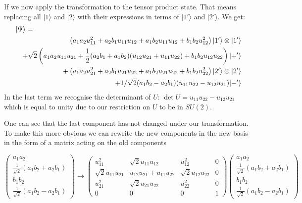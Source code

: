 \documentclass[12pt]{article}
\begin{document}
      If we now apply the transformation to the tensor product state. That means replacing all $|1\rangle$ and $|2\rangle$ with their expressions in terms of $|1'\rangle$ and $|2'\rangle$. We get:
      \begin{eqnarray}
     \lefteqn{   |\Psi\rangle =}&&\nonumber\\
        && \left(a_{1} a_{2} u_{11}^2 + a_{2} b_{1} u_{11} u_{12} + a_{1} b_{2} u_{11} u_{12} + b_{1} b_{2} u_{12}^2\right) |1'\rangle \otimes |1'\rangle\nonumber\\
        && +\sqrt{2}\left(a_{1} a_{2} u_{11} u_{21} + \frac{1}{2} (a_{2} b_{1}+a_{1} b_{2}) (u_{12} u_{21}+u_{11} u_{22} ) + b_{1} b_{2} u_{12} u_{22}\right) |+'\rangle \nonumber\\
        &&+ \left(a_{1} a_{2} u_{21}^2 + a_{2} b_{1} u_{21} u_{22} + a_{1} b_{2} u_{21} u_{22} + b_{1} b_{2} u_{22}^2\right) |2'\rangle \otimes |2'\rangle\nonumber\\
        && +1/\sqrt2 (a_{1} b_{2} - a_{2} b_{1}) (u_{11} u_{22} - u_{12} u_{21})|-'\rangle
      \end{eqnarray}
      In the last term we recognise the determinant of $U$: $\det U=u_{11}u_{22}-u_{12}u_{21}$ which is equal to unity due to our restriction on $U$ to be in $SU(2)$.

      One can see that the last component has not changed under our transformation. To make this more obvious we can rewrite the new components in the new basis in the form of a matrix acting on the old components

      \[\left(\begin{array}{c}a_1a_2\\\frac{1}{\sqrt2}(a_1b_2+a_2b_1)\\b_1b_2\\\frac{1}{\sqrt{2}}(a_1b_2-a_2b_1)\end{array}\right)\rightarrow
      \left(\begin{array}{cccc}
        u_{11}^2&\sqrt{2} u_{11} u_{12}&u_{12}^2&0 \\
        \sqrt{2}u_{11}u_{21}&u_{12} u_{21} +u_{11}u_{22}&\sqrt{2}u_{12}u_{22}&0 \\
        u_{21}^2& \sqrt{2}u_{21} u_{22}&u_{22}^2&0 \\
        0&0&0& 1
      \end{array}\right) \left(\begin{array}{c}a_1a_2\\\frac{1}{\sqrt2}(a_1b_2+a_2b_1)\\b_1b_2\\\frac{1}{\sqrt2}(a_1b_2-a_2b_1)\end{array}\right) \]
\end{document}
